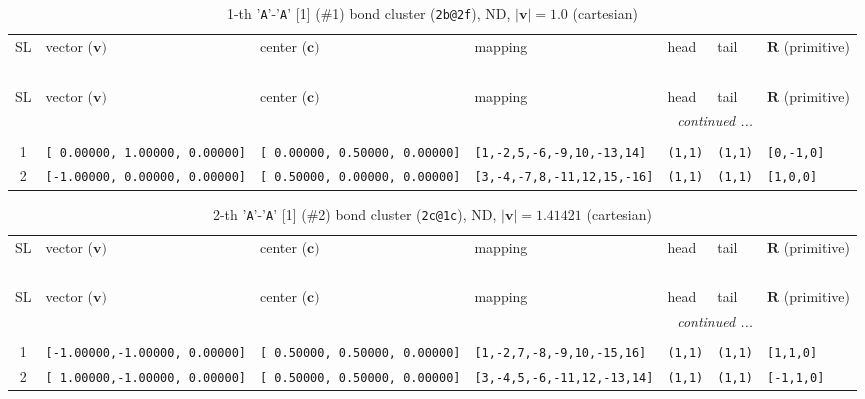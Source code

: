 \documentclass[fleqn,10pt,landscape]{jsarticle}
\begin{document}
\renewcommand{\arraystretch}{1.6}
\begin{longtable}[l]{cllllll}
\captionsetup{justification=raggedright, singlelinecheck=off}
\caption{1-th '\texttt{A}'-'\texttt{A}' [1] (\#1) bond cluster (\texttt{2b@2f}), ND, $|\bm{v}|=1.0$ (cartesian)}
 \\
 \hline \hline
SL & vector ($\bm{v})$ & center ($\bm{c})$ & mapping & head & tail & $\bm{R}$ (primitive) \\ \hline \endfirsthead

\multicolumn{6}{l}{\tablename\ \thetable{}} \\
 \hline \hline
SL & vector ($\bm{v})$ & center ($\bm{c})$ & mapping & head & tail & $\bm{R}$ (primitive) \\ \hline \endhead

 \hline \hline
\multicolumn{6}{r}{\footnotesize\it continued ...} \\ \endfoot

 \hline \hline
\multicolumn{6}{r}{} \\ \endlastfoot

1 & \texttt{[ 0.00000, 1.00000, 0.00000]} & \texttt{[ 0.00000, 0.50000, 0.00000]} & \texttt{[1,-2,5,-6,-9,10,-13,14]} & \texttt{(1,1)} & \texttt{(1,1)} & \texttt{[0,-1,0]} \\ \hline
2 & \texttt{[-1.00000, 0.00000, 0.00000]} & \texttt{[ 0.50000, 0.00000, 0.00000]} & \texttt{[3,-4,-7,8,-11,12,15,-16]} & \texttt{(1,1)} & \texttt{(1,1)} & \texttt{[1,0,0]} \\
\end{longtable}
\renewcommand{\arraystretch}{1.6}
\begin{longtable}[l]{cllllll}
\captionsetup{justification=raggedright, singlelinecheck=off}
\caption{2-th '\texttt{A}'-'\texttt{A}' [1] (\#2) bond cluster (\texttt{2c@1c}), ND, $|\bm{v}|=1.41421$ (cartesian)}
 \\
 \hline \hline
SL & vector ($\bm{v})$ & center ($\bm{c})$ & mapping & head & tail & $\bm{R}$ (primitive) \\ \hline \endfirsthead

\multicolumn{6}{l}{\tablename\ \thetable{}} \\
 \hline \hline
SL & vector ($\bm{v})$ & center ($\bm{c})$ & mapping & head & tail & $\bm{R}$ (primitive) \\ \hline \endhead

 \hline \hline
\multicolumn{6}{r}{\footnotesize\it continued ...} \\ \endfoot

 \hline \hline
\multicolumn{6}{r}{} \\ \endlastfoot

1 & \texttt{[-1.00000,-1.00000, 0.00000]} & \texttt{[ 0.50000, 0.50000, 0.00000]} & \texttt{[1,-2,7,-8,-9,10,-15,16]} & \texttt{(1,1)} & \texttt{(1,1)} & \texttt{[1,1,0]} \\ \hline
2 & \texttt{[ 1.00000,-1.00000, 0.00000]} & \texttt{[ 0.50000, 0.50000, 0.00000]} & \texttt{[3,-4,5,-6,-11,12,-13,14]} & \texttt{(1,1)} & \texttt{(1,1)} & \texttt{[-1,1,0]} \\
\end{longtable}
\end{document}
